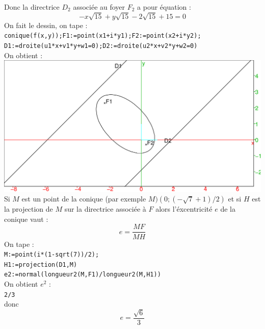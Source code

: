 \documentclass[a4paper,11pt]{book}
\begin{document}
Donc la directrice $D_2$ associ\'ee au foyer $F_2$ a pour \'equation :
$$-x\sqrt{15}+y\sqrt{15}-2\sqrt{15}+15=0$$
On fait le dessin, on tape :\\
{\tt conique(f(x,y));F1:=point(x1+i*y1);F2:=point(x2+i*y2);}\\ 
{\tt D1:=droite(u1*x+v1*y+w1=0);D2:=droite(u2*x+v2*y+w2=0)}\\
On obtient :\\
\includegraphics[width=\textwidth]{conicfd}\\
Si  $M$ est un point de la conique (par exemple $M)(0;(-\sqrt 7+1)/2)$ et si
$H$ est la projection de $M$ sur la directrice associ\'ee \`a $F$ alors
l'\'excentricit\'e $e$ de la conique vaut :
$$e=\frac{MF}{MH}$$
On tape :\\
{\tt M:=point(i*(1-sqrt(7))/2);}\\
{\tt H1:=projection(D1,M)}\\
{\tt e2:=normal(longueur2(M,F1)/longueur2(M,H1))}\\
On obtient $e^2$ :\\
{\tt 2/3}\\
donc 
$$e=\frac{\sqrt 6}{3}$$
\end{document}
